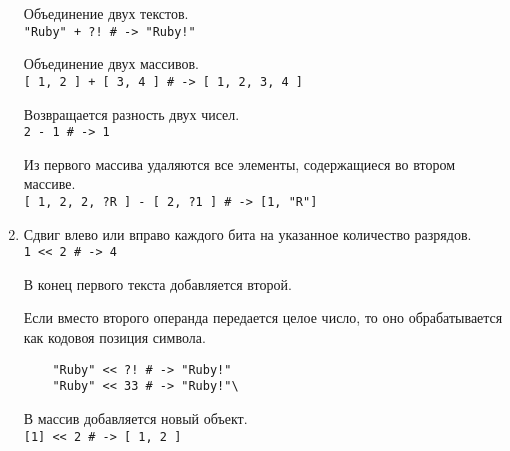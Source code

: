 \begin{enumerate}
  \begin{operator}
    Объединение двух текстов.
    \\\verb|"Ruby" + ?! # -> "Ruby!"|
  \end{operator}

  \begin{operator}
    Объединение двух массивов.
    \\\verb![ 1, 2 ] + [ 3, 4 ] # -> [ 1, 2, 3, 4 ]!
  \end{operator}

  \begin{operator}
    Возвращается разность двух чисел.
    \\\verb!2 - 1 # -> 1!
  \end{operator}

  \begin{operator}
    Из первого массива удаляются все элементы, содержащиеся во втором массиве.
    \\\verb![ 1, 2, 2, ?R ] - [ 2, ?1 ] # -> [1, "R"]!
  \end{operator}

  \item %
  \begin{operator}
    Сдвиг влево или вправо каждого бита на указанное количество разрядов.
    \\\verb!1 << 2 # -> 4!
  \end{operator}

  \begin{operator}
    В конец первого текста добавляется второй. 

    Если вместо второго операнда передается целое число, то оно обрабатывается как кодовоя позиция символа.
    \begin{verbatim}
    "Ruby" << ?! # -> "Ruby!"
    "Ruby" << 33 # -> "Ruby!"\
    \end{verbatim}
  \end{operator}

  \begin{operator}
    В массив добавляется новый объект.
    \\\verb![1] << 2 # -> [ 1, 2 ]!
  \end{operator}


\end{enumerate}

